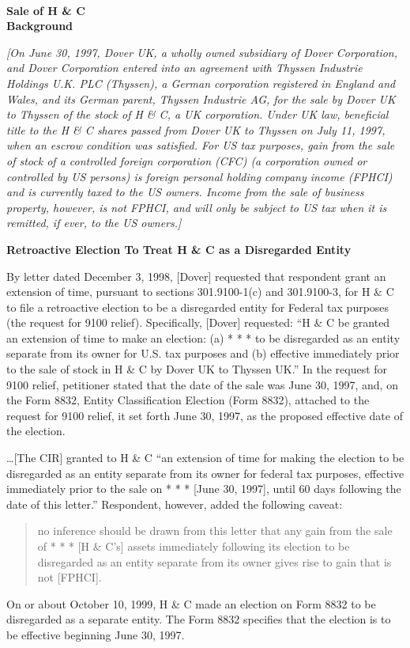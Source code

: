 \begin{select}
\\
\begin{center}\textbf{Sale of H \& C}\\
\textbf{Background}\\
\end{center}
\textit{[On June 30, 1997, Dover UK, a wholly owned subsidiary of Dover Corporation, and Dover Corporation entered into an agreement with Thyssen Industrie Holdings U.K. PLC (Thyssen), a German corporation registered in England and Wales, and its German parent, Thyssen Industrie AG, for the sale by Dover UK to Thyssen of the stock of H \& C, a UK corporation.  Under UK law, beneficial title to the H \& C shares passed from Dover UK to Thyssen on July 11, 1997, when an escrow condition was satisfied.  For US tax purposes, gain from the sale of stock of a controlled foreign corporation (CFC) (a corporation owned or controlled by US persons) is foreign personal holding company income (FPHCI) and is currently taxed to the US owners.  Income from the sale of business property, however, is not FPHCI, and will only be subject to US tax when it is remitted, if ever, to the US owners.]}
\begin{center} \textbf{Retroactive Election To Treat H \& C as a Disregarded Entity}\\
\end{center}
By letter dated December 3, 1998, [Dover] requested that respondent grant an extension of time, pursuant to sections 301.9100-1(c) and 301.9100-3, for H \& C to file a retroactive election to be a disregarded entity for Federal tax purposes (the request for 9100 relief). Specifically, [Dover] requested: ``H \& C be granted an extension of time to make an election: (a) * * * to be disregarded as an entity separate from its owner for U.S. tax purposes and (b) effective immediately prior to the sale of stock in H \& C by Dover UK to Thyssen UK.'' In the request for 9100 relief, petitioner stated that the date of the sale was June 30, 1997, and, on the Form 8832, Entity
Classification Election (Form 8832), attached to the request for 9100 relief, it set forth June 30, 1997, as the proposed effective date of the election.

\ldots [The CIR] granted to H \& C ``an extension of time for making the election to be disregarded as an entity separate from its owner for
federal tax purposes, effective immediately prior to the sale on * * * [June 30, 1997], until 60 days following the date of this
letter.'' Respondent, however, added the following caveat:
\begin{quote}no inference should be drawn from this letter that any gain from the sale of * * * [H \& C's] assets immediately following its
election to be disregarded as an entity separate from its owner gives rise to gain that is not [FPHCI].
\end{quote}
On or about October 10, 1999, H \& C made an election on Form 8832 to be disregarded as a separate entity. The Form 8832 specifies that the election is to be effective beginning June 30, 1997.


\end{select}
